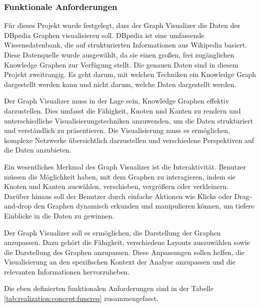 \subsubsection{Funktionale Anforderungen}

Für dieses Projekt wurde festgelegt, dass der Graph Visualizer die Daten des DBpedia Graphen visualisieren soll. DBpedia ist eine umfassende Wissensdatenbank, die auf strukturierten Informationen aus Wikipedia basiert. Diese Datenquelle wurde ausgewählt, da sie einen großen, frei zugänglichen Knowledge Graphen zur Verfügung stellt. Die genauen Daten sind in diesem Projekt zweitrangig. Es geht darum, mit welchen Techniken ein Knowledge Graph dargestellt werden kann und nicht darum, welche Daten dargestellt werden.

Der Graph Visualizer muss in der Lage sein, Knowledge Graphen effektiv darzustellen. Dies umfasst die Fähigkeit, Knoten und Kanten zu rendern und unterschiedliche Visualisierungstechniken anzuwenden, um die Daten strukturiert und verständlich zu präsentieren. Die Visualisierung muss es ermöglichen, komplexe Netzwerke übersichtlich darzustellen und verschiedene Perspektiven auf die Daten anzubieten.

Ein wesentliches Merkmal des Graph Visualizer ist die Interaktivität. Benutzer müssen die Möglichkeit haben, mit dem Graphen zu interagieren, indem sie Knoten und Kanten auswählen, verschieben, vergrößern oder verkleinern. Darüber hinaus soll der Benutzer durch einfache Aktionen wie Klicks oder Drag-and-drop den Graphen dynamisch erkunden und manipulieren können, um tiefere Einblicke in die Daten zu gewinnen.

Der Graph Visualizer soll es ermöglichen, die Darstellung der Graphen anzupassen. Dazu gehört die Fähigkeit, verschiedene Layouts auszuwählen sowie die Darstellung des Graphen anzupassen. Diese Anpassungen sollen helfen, die Visualisierung an den spezifischen Kontext der Analyse anzupassen und die relevanten Informationen hervorzuheben.

Die eben definierten funktionalen Anforderungen sind in der Tabelle \ref{tab:realization:concept:funcreq} zusammengefasst.

